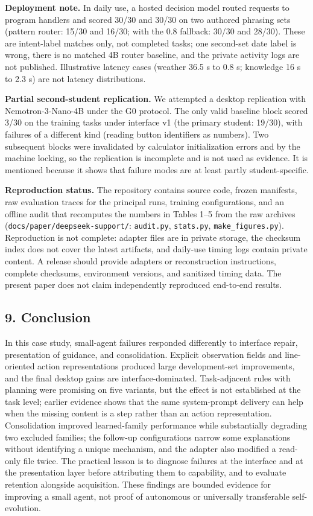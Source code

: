 \documentclass[
  10pt,
]{article}
\begin{document}
\textbf{Deployment note.} In daily use, a hosted decision model routed
requests to program handlers and scored 30/30 and 30/30 on two authored
phrasing sets (pattern router: 15/30 and 16/30; with the 0.8 fallback:
30/30 and 28/30). These are intent-label matches only, not completed
tasks; one second-set date label is wrong, there is no matched 4B router
baseline, and the private activity logs are not published. Illustrative
latency cases (weather 36.5 s to 0.8 s; knowledge 16 s to 2.3 s) are not
latency distributions.

\textbf{Partial second-student replication.} We attempted a desktop
replication with Nemotron-3-Nano-4B under the G0 protocol. The only
valid baseline block scored 3/30 on the training tasks under interface
v1 (the primary student: 19/30), with failures of a different kind
(reading button identifiers as numbers). Two subsequent blocks were
invalidated by calculator initialization errors and by the machine
locking, so the replication is incomplete and is not used as evidence.
It is mentioned because it shows that failure modes are at least partly
student-specific.

\textbf{Reproduction status.} The repository contains source code,
frozen manifests, raw evaluation traces for the principal runs, training
configurations, and an offline audit that recomputes the numbers in
Tables 1--5 from the raw archives
(\texttt{docs/paper/deepseek-support/}: \texttt{audit.py},
\texttt{stats.py}, \texttt{make\_figures.py}). Reproduction is not
complete: adapter files are in private storage, the checksum index does
not cover the latest artifacts, and daily-use timing logs contain
private content. A release should provide adapters or reconstruction
instructions, complete checksums, environment versions, and sanitized
timing data. The present paper does not claim independently reproduced
end-to-end results.

\subsection{9. Conclusion}\label{conclusion}

In this case study, small-agent failures responded differently to
interface repair, presentation of guidance, and consolidation. Explicit
observation fields and line-oriented action representations produced
large development-set improvements, and the final desktop gains are
interface-dominated. Task-adjacent rules with planning were promising on
five variants, but the effect is not established at the task level;
earlier evidence shows that the same system-prompt delivery can help
when the missing content is a step rather than an action representation.
Consolidation improved learned-family performance while substantially
degrading two excluded families; the follow-up configurations narrow
some explanations without identifying a unique mechanism, and the
adapter also modified a read-only file twice. The practical lesson is to
diagnose failures at the interface and at the presentation layer before
attributing them to capability, and to evaluate retention alongside
acquisition. These findings are bounded evidence for improving a small
agent, not proof of autonomous or universally transferable
self-evolution.
\end{document}
